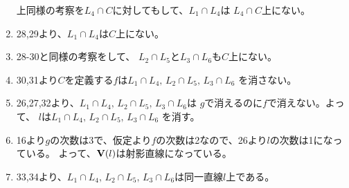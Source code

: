 \begin{myproof}
\begin{enumerate}
    上同様の考察を$L_4\cap C$に対してもして、$L_1 \cap L_4$は
    $L_4\cap C$上にない。
    \item
    28,29より、$L_1\cap L_4$は$C$上にない。
    \item
    28-30と同様の考察をして、
    $L_2\cap L_5$と$L_3\cap L_6$も$C$上にない。
    \item
    30,31より$C$を定義する$f$は$L_1\cap L_4,\, L_2\cap L_5,\, L_3\cap L_6$
    を消さない。
    \item
    26,27,32より、$L_1\cap L_4,\, L_2 \cap L_5,\, L_3\cap L_6$は
    $g$で消えるのに$f$で消えない。よって、
    $l$は$L_1\cap L_4,\, L_2 \cap L_5,\, L_3\cap L_6$
    を消す。
    \item
    16より$g$の次数は3で、仮定より$f$の次数は2なので、26より$l$の次数は1になっている。
    よって、$\textbf V(l)$は射影直線になっている。
    \item
    33,34より、$L_1\cap L_4,\, L_2\cap L_5,\, L_3\cap L_6$は同一直線$l$上である。
  \end{enumerate}
\end{myproof}
